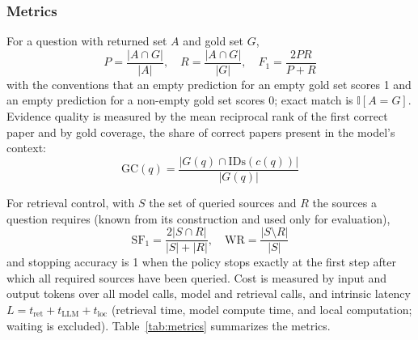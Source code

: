 \documentclass[conference]{IEEEtran}
\begin{document}
\subsubsection{Metrics}

For a question with returned set $A$ and gold set $G$,
\begin{equation}
P=\frac{|A\cap G|}{|A|},\quad R=\frac{|A\cap G|}{|G|},\quad F_1=\frac{2PR}{P+R}
\label{eq:prf}
\end{equation}
with the conventions that an empty prediction for an empty gold set scores 1 and an empty prediction for a non-empty gold set scores 0; exact match is $\mathbb{I}[A=G]$. Evidence quality is measured by the mean reciprocal rank of the first correct paper and by gold coverage, the share of correct papers present in the model's context:
\begin{equation}
\mathrm{GC}(q)=\frac{|G(q)\cap\mathrm{IDs}(c(q))|}{|G(q)|}
\label{eq:gc}
\end{equation}

For retrieval control, with $S$ the set of queried sources and $R$ the sources a question requires (known from its construction and used only for evaluation),
\begin{equation}
\mathrm{SF}_1=\frac{2|S\cap R|}{|S|+|R|},\quad \mathrm{WR}=\frac{|S\setminus R|}{|S|}
\label{eq:source}
\end{equation}
and stopping accuracy is 1 when the policy stops exactly at the first step after which all required sources have been queried. Cost is measured by input and output tokens over all model calls, model and retrieval calls, and intrinsic latency $L=t_{\text{ret}}+t_{\text{LLM}}+t_{\text{loc}}$ (retrieval time, model compute time, and local computation; waiting is excluded). Table~\ref{tab:metrics} summarizes the metrics.
\end{document}

